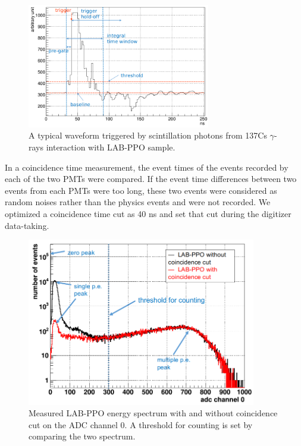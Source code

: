 \begin{figure}[htbp]
	\centering	
	\includegraphics[width=8cm]{teLS_waveform.png}
	\caption{A typical waveform triggered by scintillation photons from 137Cs $\gamma$-rays interaction with LAB-PPO sample.}
	\label{teLSwaveform}
\end{figure}

In a coincidence time measurement, the event times of the events recorded by each of the two PMTs were compared. If the event time differences between two events from each PMTs were too long, these two events were considered as random noises rather than the physics events and were not recorded. We optimized a coincidence time cut as 40 ns and set that cut during the digitizer data-taking. 

\begin{figure}[htbp]
	\centering	
	\includegraphics[width=10cm]{TeLScoinCut.png}
	\caption{Measured LAB-PPO energy spectrum with and without coincidence cut on the ADC channel 0.  A threshold for counting is set by comparing the two spectrum.}
	\label{teLScoinCut}
\end{figure}

